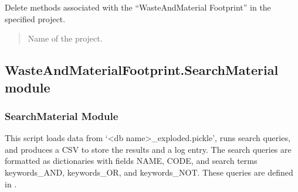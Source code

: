 \documentclass[letterpaper,10pt,english]{sphinxmanual}
\begin{document}

\begin{fulllineitems}
\label{\detokenize{WasteAndMaterialFootprint:WasteAndMaterialFootprint.MethodEditor.DeleteMethods}}
\pysigstartsignatures
{}
\pysigstopsignatures
\sphinxAtStartPar
Delete methods associated with the “WasteAndMaterial Footprint” in the specified project.
\begin{quote}\begin{description}
\sphinxAtStartPar
{} \textendash{} Name of the project.

\end{description}\end{quote}

\end{fulllineitems}



\subsection{WasteAndMaterialFootprint.SearchMaterial module}
\label{\detokenize{WasteAndMaterialFootprint:module-WasteAndMaterialFootprint.SearchMaterial}}\label{\detokenize{WasteAndMaterialFootprint:wasteandmaterialfootprint-searchmaterial-module}}

\subsubsection{SearchMaterial Module}
\label{\detokenize{WasteAndMaterialFootprint:searchmaterial-module}}
\sphinxAtStartPar
This script loads data from ‘\textless{}db name\textgreater{}\_exploded.pickle’, runs search queries, 
and produces a CSV to store the results and a log entry. The search queries are 
formatted as dictionaries with fields NAME, CODE, and search terms keywords\_AND, 
keywords\_OR, and keywords\_NOT. These queries are defined in .
\end{document}
